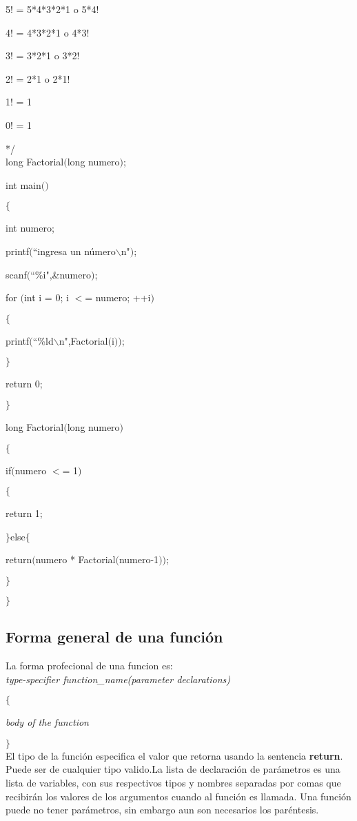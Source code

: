 \documentclass[]{article}
\begin{document}
	5! = 5*4*3*2*1	o	5*4!
	
	4! = 4*3*2*1	o	4*3!
	
	3! = 3*2*1		o	3*2!
	
	2! = 2*1		o	2*1!
	
	1! = 1
	
	0! = 1
	
	*\slash\\
	
	long Factorial$($long numero$)$;
	
	int main$($$)$
	
	$\lbrace$
	
	int numero;
	
	printf$($``ingresa un número$\backslash$n"$)$;
	
	scanf$($``\%i",\&numero$)$;
	
	for $($int i = 0; i $<$= numero; ++i$)$
	
	$\lbrace$
	
	printf$($``\%ld$\backslash$n",Factorial$($i$)$$)$;
	
	$\rbrace$
	
	return 0;
	
	$\rbrace$
	
	long Factorial$($long numero$)$
	
	$\lbrace$
	
	if$($numero $<$= 1$)$
	
	$\lbrace$
	
	return 1;
	
	$\rbrace$else$\lbrace$
	
	return$($numero * Factorial$($numero-1$)$$)$;
	
	$\rbrace$
	
	$\rbrace$
	
	\subsection{Forma general de una función}
	
	La forma profecional de una funcion es:\\
	
	\textit{type-specifier function\_name(parameter declarations)}
	
	$\lbrace$
	
	\textit{body of the function}
	
	$\rbrace$\\
	
	El tipo de la función especifica el valor que retorna usando la sentencia \textbf{return}. Puede ser de cualquier tipo valido.La lista de declaración de parámetros es una lista de variables, con sus respectivos tipos y nombres separadas por comas que recibirán los valores de los argumentos cuando al función es llamada. Una función puede no tener parámetros, sin embargo aun son necesarios los paréntesis.
	
\end{document}
